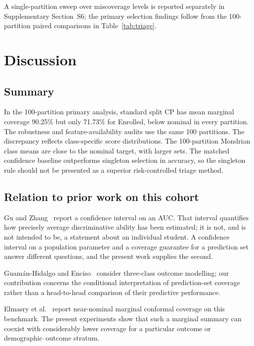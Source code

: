 A single-partition sweep over miscoverage levels is reported separately
in Supplementary Section~S6; the primary selection findings follow from
the 100-partition paired comparisons in Table~\ref{tab:triage}.

\section{Discussion}\label{sec:discussion}

\subsection{Summary}

In the 100-partition primary analysis, standard split CP has mean marginal
coverage 90.25\% but only 71.73\% for Enrolled, below nominal in every
partition. The robustness and feature-availability audits use the same 100 partitions.
The discrepancy reflects class-specific score distributions.
The 100-partition Mondrian class means are close to the nominal target,
with larger sets. The matched confidence baseline outperforms singleton
selection in accuracy, so the singleton rule should not be presented as a
superior risk-controlled triage method.

\subsection{Relation to prior work on this cohort}

Gu and Zhang~\cite{gu2026} report a confidence interval on an AUC. That
interval quantifies how precisely average discriminative ability has been
estimated; it is not, and is not intended to be, a statement about an individual
student. A confidence interval on a population parameter and a coverage
guarantee for a prediction set answer different questions, and the present work
supplies the second.

Guamán-Hidalgo and Enciso~\cite{guaman2026} consider three-class
outcome modelling; our contribution concerns the conditional interpretation of
prediction-set coverage rather than a head-to-head comparison of their
predictive performance.

Elmasry et al.~\cite{elmasry2026} report near-nominal marginal conformal
coverage on this benchmark. The present experiments show that such a marginal
summary can coexist with considerably lower coverage for a particular outcome
or demographic--outcome stratum. 

